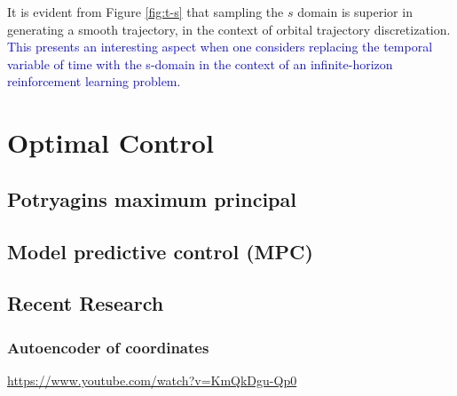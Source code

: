 It is evident from Figure \ref{fig:t-s} that sampling the $s$ domain is superior
in generating a smooth trajectory, in the context of orbital trajectory
discretization. \textcolor{blue}{This presents an interesting aspect when one
considers replacing the temporal variable of time with the s-domain in the
context of an infinite-horizon reinforcement learning problem.}

\section{Optimal Control}

\subsection{Potryagins maximum principal}

\subsection{Model predictive control (MPC)}

\subsection{Recent Research}

\subsubsection{Autoencoder of coordinates}

\url{https://www.youtube.com/watch?v=KmQkDgu-Qp0}
